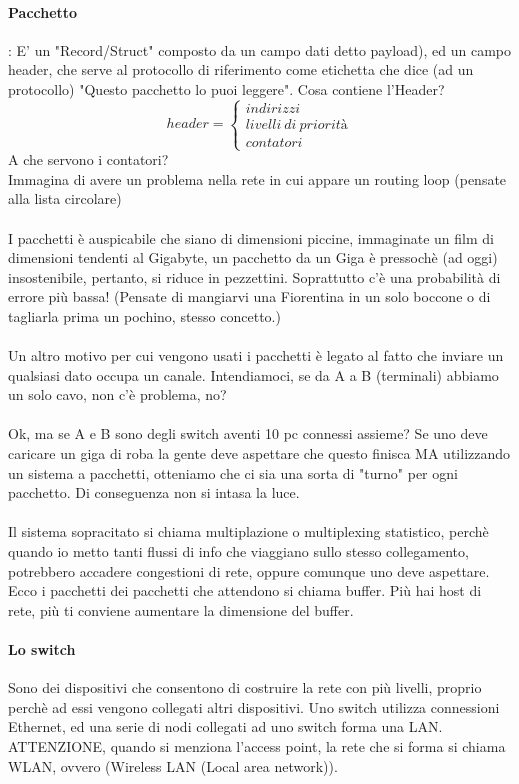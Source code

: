 \documentclass[12pt, a4paper, openany, twoside]{book}
\begin{document}
\paragraph{Pacchetto}: E' un "Record/Struct" composto da un campo dati 
detto payload), ed un
campo header, che serve al protocollo di riferimento come etichetta che dice (ad 
un protocollo)  "Questo pacchetto lo puoi leggere".
Cosa contiene l'Header? 
$$header=\begin{cases}
indirizzi \\ livelli~di~priorità \\ contatori 
\end{cases}$$
A che servono i contatori? 	\\
Immagina di avere un problema nella rete in cui appare un routing loop (pensate
alla lista circolare)\\ \\
I pacchetti è auspicabile che siano di dimensioni piccine, immaginate un film 
di dimensioni tendenti al Gigabyte, un pacchetto da un Giga è pressochè (ad oggi)
insostenibile, pertanto, si riduce in pezzettini. Soprattutto c'è una probabilità
di errore più bassa! 
(Pensate di mangiarvi una Fiorentina in un solo boccone o di tagliarla prima un
pochino, stesso concetto.) \\ \\
Un altro motivo per cui vengono usati i pacchetti è legato al fatto che inviare
un qualsiasi dato occupa un canale. Intendiamoci, se da A a B (terminali) abbiamo un solo
cavo, non c'è problema, no?	\\ \\ Ok, ma se A e B sono degli switch aventi 10 pc 
connessi assieme? Se uno deve caricare un giga di roba la gente deve aspettare 
che questo finisca MA utilizzando un sistema a pacchetti, otteniamo che ci sia
una sorta di "turno" per ogni pacchetto. Di conseguenza non si intasa la luce.
\\ \\
Il sistema sopracitato si chiama multiplazione o multiplexing statistico, perchè
quando io metto tanti flussi di info che viaggiano sullo stesso collegamento, 
potrebbero accadere congestioni di rete, oppure comunque uno deve aspettare. Ecco
i pacchetti dei pacchetti che attendono si chiama buffer. Più hai host di rete,
più ti conviene aumentare la dimensione del buffer.
\\
\paragraph{Lo switch} Sono dei dispositivi che consentono di costruire la rete
con più livelli, proprio perchè ad essi vengono collegati altri dispositivi. 
Uno switch utilizza connessioni Ethernet, ed una serie di nodi collegati ad uno
switch forma una LAN. ATTENZIONE, quando si menziona l'access point, la rete 
che si forma si chiama WLAN, ovvero (Wireless LAN (Local area network)).
\end{document}
